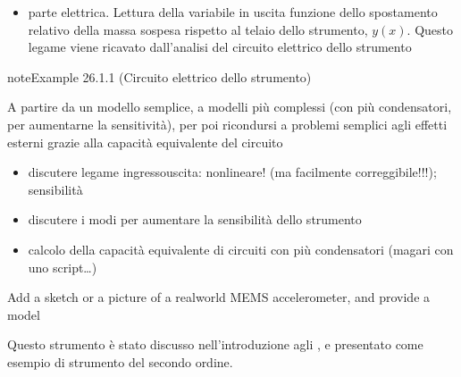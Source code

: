 \documentclass[letterpaper,10pt,italian]{jupyterBook}
\begin{document}
\sphinxAtStartPar
{} 
\begin{itemize}
\item {} 
\sphinxAtStartPar
parte elettrica. Lettura della variabile in uscita funzione dello spostamento relativo della massa sospesa rispetto al telaio dello strumento, \(y(x)\). Questo legame viene ricavato dall’analisi del circuito elettrico dello strumento {\hyperref[\detokenize{ch/electromagnetism/electrical-engineering-instruments:mems-accelerometer-circuit}]{}}

\end{itemize}
\label{ch/electromagnetism/electrical-engineering-instruments:mems-accelerometer-circuit}
\begin{sphinxadmonition}{note}{Example 26.1.1 (Circuito elettrico dello strumento)}



\sphinxAtStartPar
{} A partire da un modello semplice, a modelli più complessi (con più condensatori, per aumentarne la sensitività), per poi ricondursi a problemi semplici agli effetti esterni grazie alla capacità equivalente del circuito
\begin{itemize}
\item {} 
\sphinxAtStartPar
discutere legame ingresso\sphinxhyphen{}uscita: non\sphinxhyphen{}lineare! (ma facilmente correggibile!!!); sensibilità

\item {} 
\sphinxAtStartPar
discutere i modi per aumentare la sensibilità dello strumento

\item {} 
\sphinxAtStartPar
calcolo della capacità equivalente di circuiti con più condensatori (magari con uno script…)

\end{itemize}
\end{sphinxadmonition}

\sphinxAtStartPar
Add a sketch or a picture of a real\sphinxhyphen{}world MEMS accelerometer, and provide a model

\sphinxAtStartPar
{} Questo strumento è stato discusso nell’introduzione agli {\hyperref[\detokenize{ch/intro/measurements:physics-hs-intro-measurements-order}]{}}, e presentato come esempio di strumento del secondo ordine.
\end{document}
